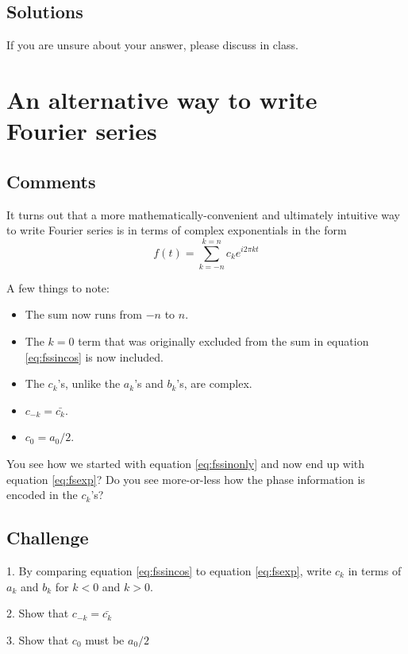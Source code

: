 \subsection*{Solutions}
If you are unsure about your answer, please discuss in class.




\newpage
\section{An alternative way to write Fourier series}
\label{sec:expfs}

\subsection*{Comments}
It turns out that a more mathematically-convenient and ultimately intuitive way to write Fourier series is in terms of complex exponentials in the form
\begin{equation}
    \label{eq:fsexp}
    f(t) = \sum_{k=-n}^{k=n} c_k e^{i 2 \pi k t}
\end{equation}

A few things to note:
\begin{itemize}
    \item The sum now runs from $-n$ to $n$.
    \item The $k=0$ term that was originally excluded from the sum in equation \ref{eq:fssincos} is now included.
    \item The $c_k$'s, unlike the $a_k$'s and $b_k$'s, are complex.
    \item $c_{-k} = \bar{c_k}$.
    \item $c_0 = a_0/2$.
\end{itemize}

You see how we started with equation \ref{eq:fssinonly} and now end up with equation \ref{eq:fsexp}? Do you see more-or-less how the phase information is encoded in the $c_k$'s?

\subsection*{Challenge}
1. By comparing equation \ref{eq:fssincos} to equation \ref{eq:fsexp}, write $c_k$ in terms of $a_k$ and $b_k$ for $k<0$ and $k>0$.

2. Show that $c_{-k} = \bar{c_k}$

3. Show that $c_0$ must be $a_0/2$

